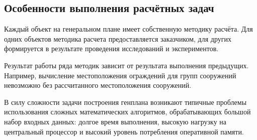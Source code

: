 \subsection{\Large{Особенности выполнения расчётных задач}}

Каждый объект на генеральном плане имеет собственную методику расчёта.
Для одних объектов методика расчета предоставляется заказчиком,
для других формируется в результате проведения исследований и экспериментов.

Результат работы ряда методик зависит от результата выполнения предыдущих.
Например, вычисление местоположения ограждений для групп сооружений невозможно без рассчитанного
местоположения сооружений.

В силу сложности задачи построения генплана
возникают типичные проблемы использования сложных математических алгоритмов,
обрабатывающих большой набор входных данных: долгое время выполнения,
высокую нагрузку на центральный процессор и высокий уровень потребления оперативной памяти.
